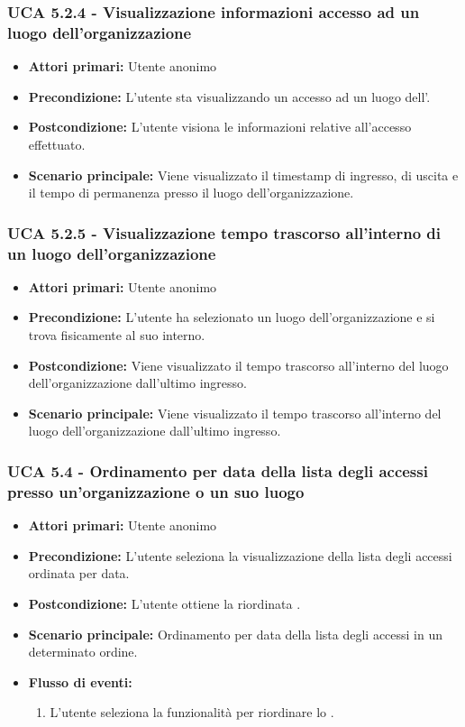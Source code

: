 \subsubsection{UCA 5.2.4 - Visualizzazione informazioni accesso ad un luogo dell'organizzazione}
\begin{itemize}
	\item \textbf{Attori primari:} Utente anonimo
	\item \textbf{Precondizione:} L'utente sta visualizzando un accesso ad un luogo dell'.
	\item \textbf{Postcondizione:} L'utente visiona le informazioni relative all'accesso effettuato.
	\item \textbf{Scenario principale:} Viene visualizzato il timestamp di ingresso, di uscita e il tempo di permanenza presso  il luogo dell'organizzazione.
\end{itemize}

\subsubsection{UCA 5.2.5 - Visualizzazione tempo trascorso all'interno di un luogo dell'organizzazione}
\begin{itemize}
	\item \textbf{Attori primari:} Utente anonimo
	\item \textbf{Precondizione:} L'utente ha selezionato un luogo dell'organizzazione e si trova fisicamente al suo interno.
	\item \textbf{Postcondizione:} Viene visualizzato il tempo trascorso all'interno del luogo dell'organizzazione dall'ultimo ingresso.
	\item \textbf{Scenario principale:} Viene visualizzato il tempo trascorso all'interno del luogo dell'organizzazione dall'ultimo ingresso.
\end{itemize}

\subsubsection{UCA 5.4 - Ordinamento per data della lista degli accessi presso un'organizzazione o un suo luogo}
\begin{itemize}
    \item \textbf{Attori primari:} Utente anonimo
    \item \textbf{Precondizione:} L'utente seleziona la visualizzazione della lista degli accessi ordinata per data.
    \item \textbf{Postcondizione:} L'utente ottiene la  riordinata .
    \item \textbf{Scenario principale:} Ordinamento per data della lista degli accessi in un determinato ordine.
    \item \textbf{Flusso di eventi:}
    \begin{enumerate}
        \item L'utente seleziona la funzionalità per riordinare lo  .
    \end{enumerate}
\end{itemize}


